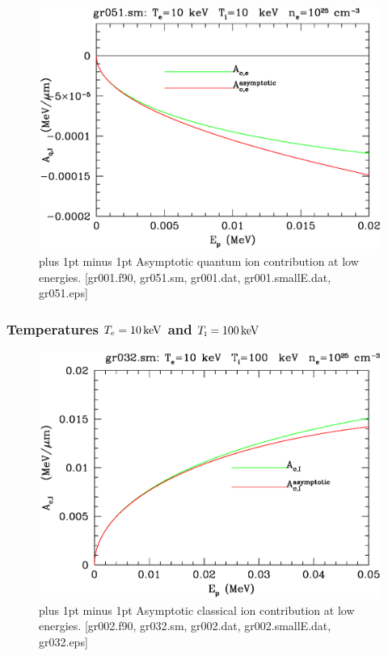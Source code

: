 \documentclass[preprint,12pt,eqsecnum,nofootinbib,amsmath,amssymb]{revtex4}
\newcommand{\smI}{{\rm\scriptscriptstyle I}}
\newcommand{\footnoteskip}{\baselineskip 12pt plus 1pt minus 1pt}
\begin{document}
\vskip-2.0cm 
\begin{figure}[h!]
\includegraphics[scale=0.45]{gr051.eps} 
\vskip-0.8cm 
\caption{\footnoteskip  
  Asymptotic quantum ion contribution at low energies. [gr001.f90,
  gr051.sm, gr001.dat, gr001.smallE.dat, gr051.eps] 
}
\label{fig:gr051}
\end{figure}



\pagebreak
\subsubsection{Temperatures $T_e=10\,{\rm keV}$ and $T_\smI=100\,{\rm keV}$}

\vskip-2cm 
\begin{figure}[h!]
\includegraphics[scale=0.45]{gr032.eps} 
\vskip-0.8cm 
\caption{\footnoteskip  
  Asymptotic classical ion contribution at low energies. [gr002.f90,
  gr032.sm, gr002.dat, gr002.smallE.dat, gr032.eps] 
}
\label{fig:gr032}
\end{figure}
\end{document}

